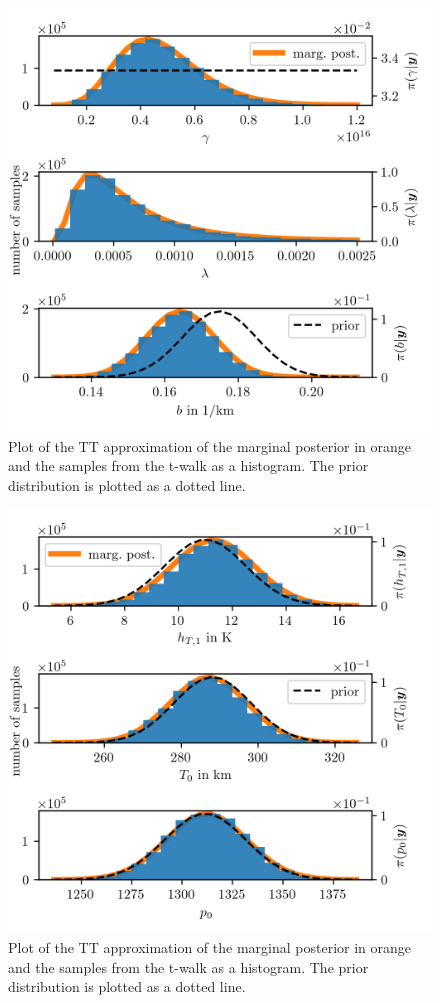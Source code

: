 \begin{figure}[ht!]
	\centering
	\includegraphics{PHdPTPost0.png}
	\caption[Histograms and TT approximation of posterior distribution as well as hyper-prior distribution.]{Plot of the TT approximation of the marginal posterior in orange and the samples from the t-walk as a histogram. The prior distribution is plotted as a dotted line.}
	\label{fig:PostHistTT0}
\end{figure}
\begin{figure}[ht!]
	\centering
	\includegraphics{PHdPTPost1.png}
	\caption[Histograms and TT approximation of posterior distribution as well as hyper-prior distribution.]{Plot of the TT approximation of the marginal posterior in orange and the samples from the t-walk as a histogram. The prior distribution is plotted as a dotted line.}
	\label{fig:PostHistTT1}
\end{figure}
